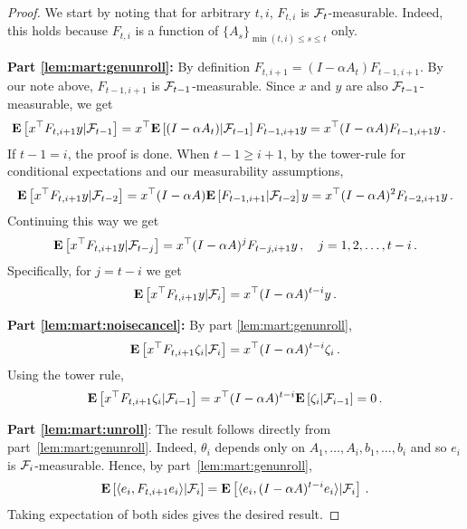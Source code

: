 \begin{proof}
We start by noting that for arbitrary $t,i$, $F_{t,i}$ is $\mathcal{F}_t$-measurable. Indeed, this holds
because $F_{t,i}$ is a function of $\{A_s\}_{\min(t,i)\le s \le t}$ only.

\noindent \textbf{Part \ref{lem:mart:genunroll}:}
By definition $F_{t,i+1} = (I-\alpha A_t) F_{t-1,i+1}$.
By our note above, $F_{t-1,i+1}$ is $\mathcal{F}_{t-1}$-measurable.
Since $x$ and $y$ are also $\mathcal{F}_{t-1}$-measurable, we get 
\begin{align*}
\mathbf{E}\left[x^\top F_{t,i+1} y | \mathcal{F}_{t-1} \right] &= x^\top \mathbf{E}\left[ (I-\alpha A_t) | \mathcal{F}_{t-1} \right] F_{t-1,i+1} y=x^\top  (I-\alpha A)  F_{t-1,i+1} y\,.
\end{align*}
If $t-1=i$, the proof is done. When $t-1\ge i+1$,
by the tower-rule for conditional expectations and our measurability assumptions,
\begin{align*}
\mathbf{E}\left[x^\top F_{t,i+1} y | \mathcal{F}_{t-2} \right]=x^\top  (I-\alpha A)  \mathbf{E}\left[F_{t-1,i+1} |\mathcal{F}_{t-2}\right] y= x^\top (I-\alpha A)^2 F_{t-2,i+1} y\,.
\end{align*}
Continuing this way we get
\begin{align*}
\mathbf{E}\left[x^\top F_{t,i+1} y | \mathcal{F}_{t-j} \right]
= x^\top (I-\alpha A)^j F_{t-j,i+1} y\,, \quad j=1,2,\dots,t-i\,.
\end{align*}
Specifically, for $j=t-i$ we get
\begin{align*}
\mathbf{E}\left[x^\top F_{t,i+1} y | \mathcal{F}_{i} \right]  = x^\top (I-\alpha A)^{t-i} y\,.
\end{align*}

\noindent \textbf{Part \ref{lem:mart:noisecancel}:}
By part \ref{lem:mart:genunroll},
\begin{align*}
\mathbf{E}\left[x^\top F_{t,i+1} \zeta_i | \mathcal{F}_{i} \right]  = x^\top (I-\alpha A)^{t-i} \zeta_i\,.
\end{align*}
Using the tower rule,
\begin{align*}
\mathbf{E}\left[x^\top F_{t,i+1} \zeta_i | \mathcal{F}_{i-1} \right]
= x^\top (I-\alpha A)^{t-i}\mathbf{E}\left[ \zeta_i | \mathcal{F}_{i-1} \right]= 0\,.
\end{align*}

\noindent \textbf{Part \ref{lem:mart:unroll}}:
The result follows directly from part~\ref{lem:mart:genunroll}. Indeed,
$\theta_i$ depends only on $A_1,\dots,A_{i},b_1,\dots,b_{i}$ and so  $e_i$ is $\mathcal{F}_i$-measurable.
Hence, by part~\ref{lem:mart:genunroll},
\begin{align*}
\mathbf{E}\left[ \langle e_i, F_{t,i+1} e_i\rangle | \mathcal{F}_i \right] =
\mathbf{E}\left[ \langle e_i, (I-\alpha A)^{t-i} e_i\rangle | \mathcal{F}_i \right]\,.
\end{align*}
Taking expectation of both sides gives the desired result.


\end{proof}
